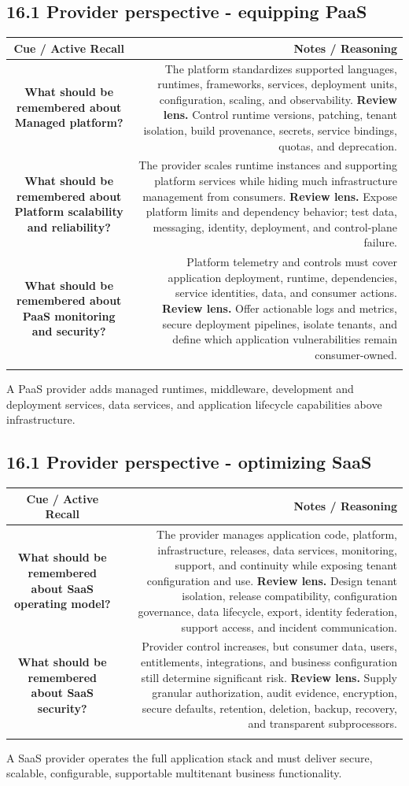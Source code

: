 \documentclass[11pt]{article}
\newcommand{\CornellHeader}{\rowcolor{Navy}\color{white}\bfseries Cue / Active Recall & \color{white}\bfseries Notes / Reasoning \\\endhead}
\newcommand{\CornellRow}[2]{\cellcolor{CueGray}\textbf{#1} & #2 \\\addlinespace[3pt]}
\begin{document}
\subsection{16.1 Provider perspective - equipping PaaS}
\begin{longtable}{@{}C N@{}}
\CornellHeader
\CornellRow{What should be remembered about Managed platform?}{The platform standardizes supported languages, runtimes, frameworks, services, deployment units, configuration, scaling, and observability. \textbf{Review lens.} Control runtime versions, patching, tenant isolation, build provenance, secrets, service bindings, quotas, and deprecation.}
\CornellRow{What should be remembered about Platform scalability and reliability?}{The provider scales runtime instances and supporting platform services while hiding much infrastructure management from consumers. \textbf{Review lens.} Expose platform limits and dependency behavior; test data, messaging, identity, deployment, and control-plane failure.}
\CornellRow{What should be remembered about PaaS monitoring and security?}{Platform telemetry and controls must cover application deployment, runtime, dependencies, service identities, data, and consumer actions. \textbf{Review lens.} Offer actionable logs and metrics, secure deployment pipelines, isolate tenants, and define which application vulnerabilities remain consumer-owned.}
\end{longtable}
\begin{sectionsummarybox}
A PaaS provider adds managed runtimes, middleware, development and deployment services, data services, and application lifecycle capabilities above infrastructure.
\end{sectionsummarybox}
\subsection{16.1 Provider perspective - optimizing SaaS}
\begin{longtable}{@{}C N@{}}
\CornellHeader
\CornellRow{What should be remembered about SaaS operating model?}{The provider manages application code, platform, infrastructure, releases, data services, monitoring, support, and continuity while exposing tenant configuration and use. \textbf{Review lens.} Design tenant isolation, release compatibility, configuration governance, data lifecycle, export, identity federation, support access, and incident communication.}
\CornellRow{What should be remembered about SaaS security?}{Provider control increases, but consumer data, users, entitlements, integrations, and business configuration still determine significant risk. \textbf{Review lens.} Supply granular authorization, audit evidence, encryption, secure defaults, retention, deletion, backup, recovery, and transparent subprocessors.}
\end{longtable}
\begin{sectionsummarybox}
A SaaS provider operates the full application stack and must deliver secure, scalable, configurable, supportable multitenant business functionality.
\end{sectionsummarybox}
\end{document}
